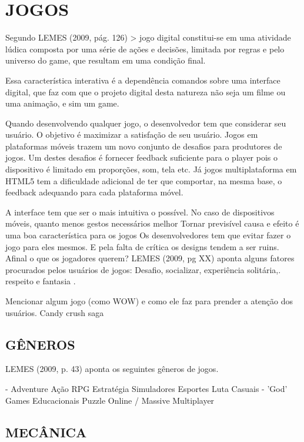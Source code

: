 \documentclass[11pt,a4paper]{article}
\begin{document}
\section{JOGOS}
Segundo LEMES (2009, pág. 126) > jogo digital constitui-se em uma
atividade lúdica composta por uma série de ações e decisões,
limitada por regras e pelo universo do game, que resultam em uma
condição final.

Essa característica interativa é a dependência comandos
sobre uma interface digital, que faz com que o projeto digital desta
natureza não seja um filme ou uma animação, e sim um game.

Quando desenvolvendo qualquer jogo, o desenvolvedor tem que considerar
seu usuário. O objetivo é maximizar a satisfação de seu usuário.
Jogos em plataformas móveis trazem um novo conjunto de desafios para
produtores de jogos. Um destes desafios é fornecer feedback suficiente
para o player pois o dispositivo é limitado em proporções, som, tela
etc. Já jogos multiplataforma em HTML5 tem a dificuldade adicional
de ter que comportar, na mesma base, o feedback adequando para cada
plataforma móvel.

A interface tem que ser o mais intuitiva o possível. No caso de       
dispositivos móveis, quanto menos gestos necessários melhor Tornar   
previsível causa e efeito é uma boa característica para os jogos    
Os desenvolvedores tem que evitar fazer o jogo para eles mesmos. E     
pela falta de crítica os designs tendem a ser ruins. Afinal o que os  
jogadores querem? LEMES (2009, pg XX) aponta alguns fatores procurados
pelos usuários de jogos: Desafio, socializar, experiência solitária,.
respeito e fantasia                                                    .

Mencionar algum jogo (como WOW) e como ele faz para prender a
atenção dos usuários. Candy crush saga 

\subsection{GÊNEROS}

LEMES (2009, p. 43) aponta os seguintes gêneros de jogos.

- Adventure Ação RPG Estratégia Simuladores Esportes Luta Casuais
- 'God' Games Educacionais Puzzle Online / Massive Multiplayer

\subsection{MECÂNICA}
\end{document}
